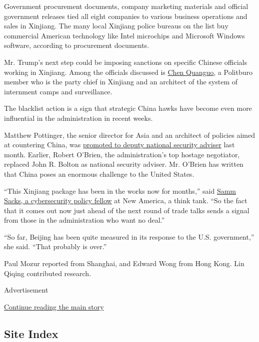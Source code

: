 Government procurement documents, company marketing materials and
official government releases tied all eight companies to various
business operations and sales in Xinjiang. The many local Xinjiang
police bureaus on the list buy commercial American technology like Intel
microchips and Microsoft Windows software, according to procurement
documents.

Mr. Trump's next step could be imposing sanctions on specific Chinese
officials working in Xinjiang. Among the officials discussed is
\href{https://www.nytimes.com/2018/10/13/world/asia/china-muslim-detainment-xinjang-camps.html}{Chen
Quanguo}, a Politburo member who is the party chief in Xinjiang and an
architect of the system of internment camps and surveillance.

The blacklist action is a sign that strategic China hawks have become
even more influential in the administration in recent weeks.

Matthew Pottinger, the senior director for Asia and an architect of
policies aimed at countering China, was
\href{https://www.wsj.com/articles/trump-picks-matt-pottinger-as-deputy-national-security-adviser-11569009233}{promoted
to deputy national security adviser} last month. Earlier, Robert
O'Brien, the administration's top hostage negotiator, replaced John R.
Bolton as national security adviser. Mr. O'Brien has written that China
poses an enormous challenge to the United States.

``This Xinjiang package has been in the works now for months,'' said
\href{https://www.newamerica.org/our-people/samm-sacks/}{Samm Sacks, a
cybersecurity policy fellow} at New America, a think tank. ``So the fact
that it comes out now just ahead of the next round of trade talks sends
a signal from those in the administration who want no deal.''

``So far, Beijing has been quite measured in its response to the U.S.
government,'' she said. ``That probably is over.''

Paul Mozur reported from Shanghai, and Edward Wong from Hong Kong. Lin
Qiqing contributed research.

Advertisement

\protect\hyperlink{after-bottom}{Continue reading the main story}

\hypertarget{site-index}{%
\subsection{Site Index}\label{site-index}}

